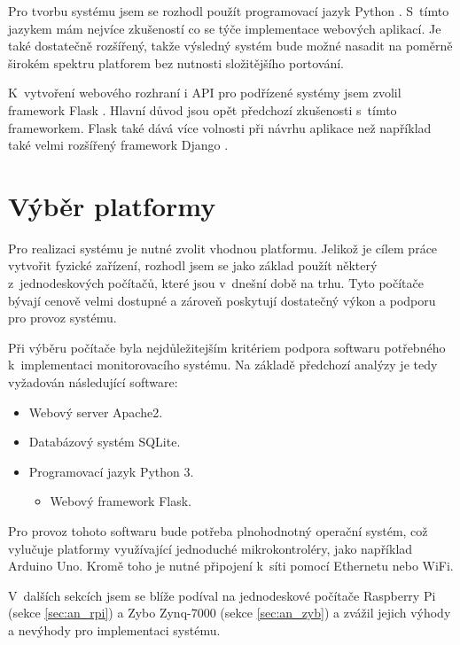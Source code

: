 Pro tvorbu systému jsem se rozhodl použít programovací jazyk Python \cite{python_tutorial}. S~tímto jazykem mám nejvíce zkušeností co se týče implementace webových aplikací. Je také dostatečně rozšířený, takže výsledný systém bude možné nasadit na poměrně širokém spektru platforem bez nutnosti složitějšího portování.

K~vytvoření webového rozhraní i API pro podřízené systémy jsem zvolil framework Flask \cite{flask_about}. Hlavní důvod jsou opět předchozí zkušenosti s~tímto frameworkem. Flask také dává více volnosti při návrhu aplikace než například také velmi rozšířený framework Django \cite{django_about}.

\section{Výběr platformy}
\label{sec:an_plat}

Pro realizaci systému je nutné zvolit vhodnou platformu. Jelikož je cílem práce vytvořit fyzické zařízení, rozhodl jsem se jako základ použít některý z~jednodeskových počítačů, které jsou v~dnešní době na trhu. Tyto počítače bývají cenově velmi dostupné a zároveň poskytují dostatečný výkon a podporu pro provoz systému.

Při výběru počítače byla nejdůležitejším kritériem podpora softwaru potřebného k~implementaci monitorovacího systému. Na základě předchozí analýzy je tedy vyžadován následující software:

\begin{itemize}
    \item Webový server Apache2.
    \item Databázový systém SQLite.
    \item Programovací jazyk Python 3.
    \begin{itemize}
        \item Webový framework Flask.
    \end{itemize}
\end{itemize}

Pro provoz tohoto softwaru bude potřeba plnohodnotný operační systém, což vylučuje platformy využívající jednoduché mikrokontroléry, jako například Arduino Uno. Kromě toho je nutné připojení k~síti pomocí Ethernetu nebo WiFi. 

V~dalších sekcích jsem se blíže podíval na jednodeskové počítače Raspberry Pi (sekce \ref{sec:an_rpi}) a Zybo Zynq-7000 (sekce \ref{sec:an_zyb}) a zvážil jejich výhody a nevýhody pro implementaci systému.

